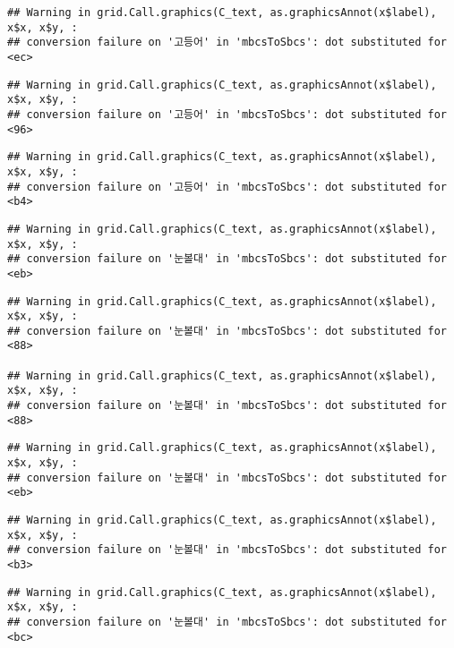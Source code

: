 \documentclass[
]{article}
\begin{document}
\begin{verbatim}
## Warning in grid.Call.graphics(C_text, as.graphicsAnnot(x$label), x$x, x$y, :
## conversion failure on '고등어' in 'mbcsToSbcs': dot substituted for <ec>
\end{verbatim}

\begin{verbatim}
## Warning in grid.Call.graphics(C_text, as.graphicsAnnot(x$label), x$x, x$y, :
## conversion failure on '고등어' in 'mbcsToSbcs': dot substituted for <96>
\end{verbatim}

\begin{verbatim}
## Warning in grid.Call.graphics(C_text, as.graphicsAnnot(x$label), x$x, x$y, :
## conversion failure on '고등어' in 'mbcsToSbcs': dot substituted for <b4>
\end{verbatim}

\begin{verbatim}
## Warning in grid.Call.graphics(C_text, as.graphicsAnnot(x$label), x$x, x$y, :
## conversion failure on '눈볼대' in 'mbcsToSbcs': dot substituted for <eb>
\end{verbatim}

\begin{verbatim}
## Warning in grid.Call.graphics(C_text, as.graphicsAnnot(x$label), x$x, x$y, :
## conversion failure on '눈볼대' in 'mbcsToSbcs': dot substituted for <88>

## Warning in grid.Call.graphics(C_text, as.graphicsAnnot(x$label), x$x, x$y, :
## conversion failure on '눈볼대' in 'mbcsToSbcs': dot substituted for <88>
\end{verbatim}

\begin{verbatim}
## Warning in grid.Call.graphics(C_text, as.graphicsAnnot(x$label), x$x, x$y, :
## conversion failure on '눈볼대' in 'mbcsToSbcs': dot substituted for <eb>
\end{verbatim}

\begin{verbatim}
## Warning in grid.Call.graphics(C_text, as.graphicsAnnot(x$label), x$x, x$y, :
## conversion failure on '눈볼대' in 'mbcsToSbcs': dot substituted for <b3>
\end{verbatim}

\begin{verbatim}
## Warning in grid.Call.graphics(C_text, as.graphicsAnnot(x$label), x$x, x$y, :
## conversion failure on '눈볼대' in 'mbcsToSbcs': dot substituted for <bc>
\end{verbatim}
\end{document}
